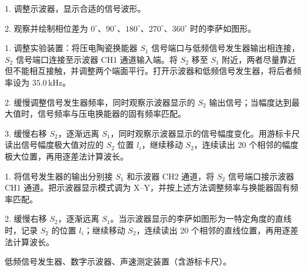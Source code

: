 \documentclass[UTF8,a4paper,10pt,fontset=fandol]{ctexart}
\newcommand{\reportsection}[1]{\par\Needspace{4\baselineskip}\vspace{0.7\baselineskip}{\heiti #1}\par\vspace{0.15\baselineskip}}
\newcommand{\reportsubsection}[1]{\par\Needspace{3\baselineskip}\vspace{0.35\baselineskip}{\heiti #1}\par}
\begin{document}
\reportsection{实验内容}
\reportsubsection{预备实验：数字示波器观测相位差}
1. 调整示波器，显示合适的信号波形。\par
2. 观察并绘制相位差为 $0^\circ$、$90^\circ$、$180^\circ$、$270^\circ$、$360^\circ$ 时的李萨如图形。\par

\reportsubsection{共振干涉法}
1. 调整实验装置：将压电陶瓷换能器 $S_1$ 信号端口与低频信号发生器输出相连接，$S_2$ 信号端口连接至示波器 CH1 通道输入端。将 $S_2$ 移至 $S_1$ 附近，两者尽量靠近但不能相互接触，并调整两个端面平行。打开示波器和低频信号发生器，将后者频率设为 $35.0\,\mathrm{kHz}$。\par
2. 缓慢调整信号发生器频率，同时观察示波器显示的 $S_2$ 输出信号；当幅度达到最大值时，信号频率与压电换能器的固有频率匹配。\par
3. 缓慢右移 $S_2$，逐渐远离 $S_1$，同时观察示波器显示的信号幅度变化。用游标卡尺读出信号幅度极大值对应的 $S_2$ 位置 $l_i$，继续移动 $S_2$，连续读出 20 个相邻的幅度极大位置，再用逐差法计算波长。\par

\reportsubsection{相位比较法}
1. 将信号发生器的输出分别接 $S_1$ 和示波器 CH2 通道，将 $S_2$ 信号端口接示波器 CH1 通道。把示波器显示模式调为 X--Y，并按上述方法调整频率与换能器固有频率匹配。\par
2. 缓慢右移 $S_2$，逐渐远离 $S_1$。当示波器显示的李萨如图形为一特定角度的直线时，记录 $S_2$ 的位置 $l_i$；继续移动 $S_2$，连续读出 20 个相邻的直线位置，再用逐差法计算波长。\par

\reportsection{实验仪器}
低频信号发生器、数字示波器、声速测定装置（含游标卡尺）。\par
\end{document}
